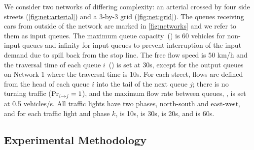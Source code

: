 We consider two networks of differing complexity: an arterial crossed by four
side streets (\cref{fig:net:arterial}) and a 3-by-3 grid (\cref{fig:net:grid}).
%
The queues receiving cars from outside of the network are
marked in \cref{fig:networks} and we refer to them as input queues.
%
The maximum queue capacity~() is 60 vehicles for non-input queues and
infinity for input queues to prevent interruption of the input demand due to
spill back from the stop line. 
%
The free flow speed is 50 km/h and the traversal time of each queue $i$~() is set at 30s,
except for the output queues on Network 1 where the traversal
time is 10s.
%
For each street, flows are defined from the head of each queue $i$ into the tail
of the next queue $j$;
%
there is no turning traffic ($\mathrm{Pr}_{i\to j}^{\mathrm{}}=1$), and the maximum flow rate
between queues, , is set at 0.5 vehicles/s.
%
All traffic lights have two phases, north-south and east-west, and for each
traffic light \tl and phase $k$,  is 10s,  is 30s,
\CTMIN{\tl} is 20s, and \CTMAX{\tl} is 60s.



%
% 
%


\subsection{Experimental Methodology}



